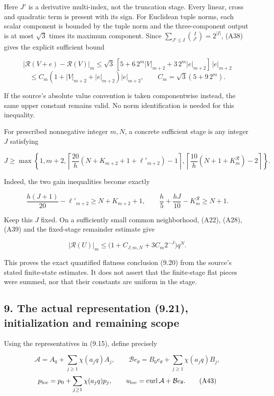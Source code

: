 \documentclass[10pt,a4paper]{article}
\begin{document}
Here \(J'\) is a derivative multi-index, not the truncation stage. Every linear, cross and quadratic term is present with its sign. For Euclidean tuple norms, each scalar component is bounded by the tuple norm and the three-component output is at most \(\sqrt3\) times its maximum component. Since \(\sum_{J'\le I}\binom I{J'}=2^{|I|}\), (A38) gives the explicit sufficient bound

\[
|\mathcal R(V+e)-\mathcal R(V)|_m
\le\sqrt3\,[5+6\,2^m|V|_{m+2}+3\,2^m|e|_{m+2}]\,|e|_{m+2}
\] \[
\le C_m(1+|V|_{m+2}+|e|_{m+2})|e|_{m+2},\qquad
C_m=\sqrt3(5+9\,2^m).
\tag{A39}
\]

If the source's absolute value convention is taken componentwise instead, the same upper constant remains valid. No norm identification is needed for this inequality.

For prescribed nonnegative integer \(m,N\), a concrete sufficient stage is any integer \(J\) satisfying

\[
J\ge\max\left\{1,m+2,
\left\lceil\frac{20}{h}(N+K_{m+2}+1+\ell'_{m+2})-1\right\rceil,
\left\lceil\frac{10}{h}(N+1+K_m^{\mathcal R})-2\right\rceil
\right\}.
\tag{A40}
\]

Indeed, the two gain inequalities become exactly

\[
\frac{h(J+1)}{20}-\ell'_{m+2}\ge N+K_{m+2}+1,
\qquad
\frac h5+\frac{hJ}{10}-K_m^{\mathcal R}\ge N+1.
\tag{A41}
\]

Keep this \(J\) fixed. On a sufficiently small common neighborhood, (A22), (A28), (A39) and the fixed-stage remainder estimate give

\[
|\mathcal R(U)|_m
\le\big(1+C_{J,m,N}+3C_m2^{-J}\big)q^N.
\tag{A42}
\]

This proves the exact quantified flatness conclusion (9.20) from the source's stated finite-state estimates. It does not assert that the finite-stage flat pieces were summed, nor that their constants are uniform in the stage.

\subsection{9. The actual representation (9.21), initialization and remaining scope}\label{the-actual-representation-9.21-initialization-and-remaining-scope}

Using the representatives in (9.15), define precisely

\[
\mathcal A=A_0+\sum_{j\ge1}\chi(a_jq)A_j,\qquad
\mathcal Be_\theta=B_0e_\theta+\sum_{j\ge1}\chi(a_jq)B_j,
\] \[
p_{\rm loc}=p_0+\sum_{j\ge1}\chi(a_jq)p_j,\qquad
u_{\rm loc}=\operatorname{curl}\mathcal A+\mathcal Be_\theta.
\tag{A43}
\]
\end{document}
